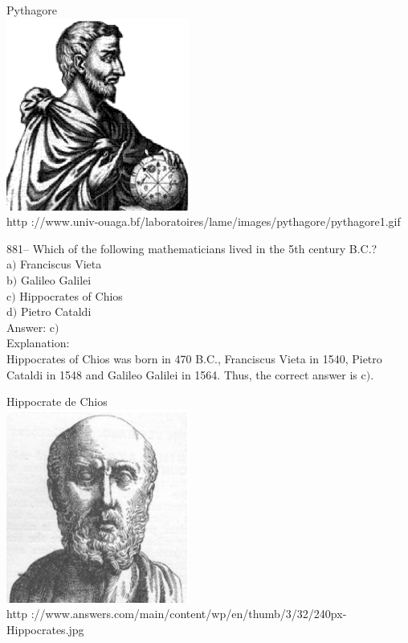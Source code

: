 \documentclass[letterpaper, 12pt]{article}
\begin{document}
        \begin{center}
        Pythagore\\
    \includegraphics[width=6cm]{pythagore1.eps}\\
        {\footnotesize http
://www.univ-ouaga.bf/laboratoires/lame/images/pythagore/pythagore1.gif}
    \end{center}

881-- Which of the following mathematicians lived in the 5th century B.C.?\\

a$)$ Franciscus Vieta \\
b$)$ Galileo Galilei \\
c$)$ Hippocrates of Chios \\
d$)$ Pietro Cataldi\\

Answer: c$)$\\

Explanation: \\
Hippocrates of Chios was born in 470 B.C., Franciscus Vieta in 1540, Pietro Cataldi in 1548 and Galileo Galilei in 1564. Thus, the correct answer is c$)$.\\

        \begin{center}
        Hippocrate de Chios\\
    \includegraphics[width=6cm]{Hippocrates.eps}\\
        {\footnotesize http
://www.answers.com/main/content/wp/en/thumb/3/32/240px-Hippocrates.jpg}
    \end{center}
\end{document}
